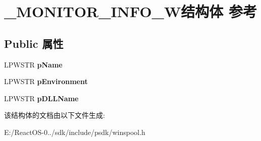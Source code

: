 \hypertarget{struct___m_o_n_i_t_o_r___i_n_f_o__2_w}{}\section{\+\_\+\+M\+O\+N\+I\+T\+O\+R\+\_\+\+I\+N\+F\+O\+\_\+W结构体 参考}
\label{struct___m_o_n_i_t_o_r___i_n_f_o__2_w}
\subsection*{Public 属性}
\begin{DoxyCompactItemize}
\item 
\mbox{\label{struct___m_o_n_i_t_o_r___i_n_f_o__2_w_ac56ce129438692b54988dc20656d3129}} 
L\+P\+W\+S\+TR {\bfseries p\+Name}
\item 
\mbox{\label{struct___m_o_n_i_t_o_r___i_n_f_o__2_w_a29eaece4f5f5f93119393e06ea9e9ba4}} 
L\+P\+W\+S\+TR {\bfseries p\+Environment}
\item 
\mbox{\label{struct___m_o_n_i_t_o_r___i_n_f_o__2_w_ac166e1231e53bf7d7038efed69a9a521}} 
L\+P\+W\+S\+TR {\bfseries p\+D\+L\+L\+Name}
\end{DoxyCompactItemize}


该结构体的文档由以下文件生成\+:\begin{DoxyCompactItemize}
\item 
E\+:/\+React\+O\+S-\/0../sdk/include/psdk/winspool.\+h\end{DoxyCompactItemize}
